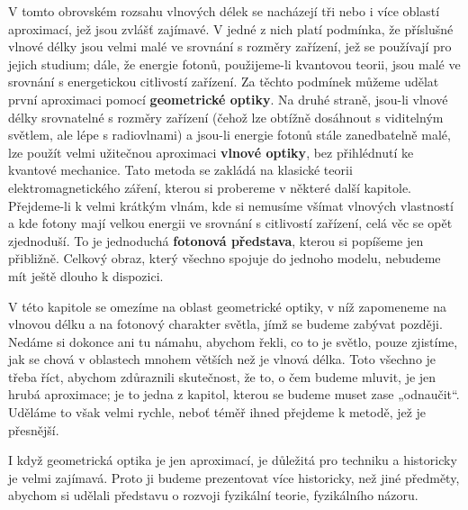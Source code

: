 {    V tomto obrovském rozsahu vlnových délek se nacházejí tři nebo i více oblastí aproximací, jež 
    jsou zvlášť zajímavé. V jedné z nich platí podmínka, že příslušné vlnové délky jsou velmi malé 
    ve srovnání s rozměry zařízení, jež se používají pro jejich studium; dále, že energie fotonů, 
    použijeme-li kvantovou teorii, jsou malé ve srovnání s energetickou citlivostí zařízení. Za 
    těchto podmínek můžeme udělat první aproximaci pomocí \textbf{geometrické optiky}. Na druhé 
    straně, jsou-li vlnové délky srovnatelné s rozměry zařízení (čehož lze obtížně dosáhnout s 
    viditelným světlem, ale lépe s radiovlnami) a jsou-li energie fotonů stále zanedbatelně malé, 
    lze použít velmi užitečnou aproximaci \textbf{vlnové optiky}, bez přihlédnutí ke kvantové 
    mechanice. Tato metoda se zakládá na klasické teorii elektromagnetického záření, kterou si 
    probereme v některé další kapitole. Přejdeme-li k velmi krátkým vlnám, kde si nemusíme všímat 
    vlnových vlastností a kde fotony mají velkou energii ve srovnání s citlivostí zařízení, celá 
    věc se opět zjednoduší. To je jednoduchá \textbf{fotonová představa}, kterou si popíšeme jen 
    přibližně. Celkový obraz, který všechno spojuje do jednoho modelu, nebudeme mít ještě dlouho k 
    dispozici.
    
    V této kapitole se omezíme na oblast geometrické optiky, v níž zapomeneme na vlnovou délku a na 
    fotonový charakter světla, jímž se budeme zabývat později. Nedáme si dokonce ani tu námahu, 
    abychom řekli, co to je světlo, pouze zjistíme, jak se chová v oblastech mnohem větších než je 
    vlnová délka. Toto všechno je třeba říct, abychom zdůraznili skutečnost, že to, o čem budeme 
    mluvit, je jen hrubá aproximace; je to jedna z kapitol, kterou se budeme muset zase „odnaučit“. 
    Uděláme to však velmi rychle, neboť téměř ihned přejdeme k metodě, jež je přesnější.
    
    I když geometrická optika je jen aproximací, je důležitá pro techniku a historicky je velmi 
    zajímavá. Proto ji budeme prezentovat více historicky, než jiné předměty, abychom si udělali 
    představu o rozvoji fyzikální teorie, fyzikálního názoru.
    
}
